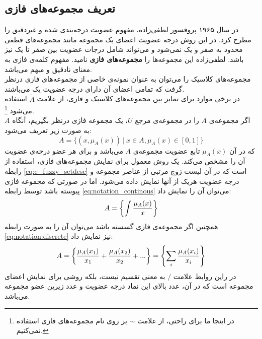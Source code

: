 \documentclass[12pt,a4paper]{article}
\theoremstyle{definition}
\begin{document}
 \subsection{تعریف مجموعه‌های فازی}
در سال ۱۹۶۵ پروفسور لطفی‌زاده، مفهوم عضویت درجه‌بندی شده و غیردقیق را مطرح کرد. در این روش درجه عضویت اعضای یک مجموعه مانند مجموعه‌های قطعی محدود به صفر و یک نمی‌شود و می‌تواند شامل درجات عضویت بین صفر تا یک نیز باشد. لطفی‌زاده این مجموعه‌ها را 
\textbf{مجموعه‌های فازی}
 نامید. مفهوم کلمه‌ی فازی به معنای نادقیق و مبهم می‌باشد. \\
 مجموعه‌های کلاسیک را می‌توان به عنوان نمونه‌ی خاصی از مجموعه‌های فازی درنظر گرفت که تمامی اعضای آن دارای درجه عضویت یک می‌باشند.
 \cite{Bojadziev2007}
 \\
 در برخی موارد برای تمایز بین مجموعه‌های کلاسیک و فازی، از علامت $\widetilde{A}$ استفاده می‌شود
 \footnote{ در اینجا ما برای راحتی، از علامت $ \sim $ بر روی نام مجموعه‌های فازی استفاده نمی‌کنیم.}.
 \cite{Lee2005}
 \\
 اگر مجموعه‌ی $A$ را در مجموعه‌ی مرجع $U$، یک مجموعه فازی درنظر بگیریم، آنگاه $A$ به صورت زیر تعریف می‌شود:
\begin{equation}\label{eq:e_fuzzy_setdesc}
A= \{  (x, \mu_{A}(x))\ |\ x \in A, \mu_{A}(x) \in [0,1]  \}
\end{equation} 
که در آن $\mu_{A}(x)$ تابع عضویت مجموعه‌ی $A$ می‌باشد و برای هر عضو درجه‌ی عضویت آن را مشخص می‌کند. 
 یک روش معمول برای نمایش مجموعه‌های فازی، استفاده از رابطه 
\ref{eq:e_fuzzy_setdesc}
است که در آن لیست زوج مرتبی از عناصر مجموعه و درجه عضویت هریک از آنها نمایش داده می‌شود.
اما در صورتی که مجموعه فازی پیوسته باشد توسط رابطه 
\ref{eq:notation_continous}
می‌توان آن را نمایش داد:
\begin{equation}\label{eq:notation_continous}
A=\left\lbrace  \int {\mu_{A}(x) \over x} \right\rbrace
\end{equation}
همچنین اگر مجموعه‌ی فازی گسسته باشد می‌توان آن را به صورت رابطه 
\ref{eq:notation:discrete}
نیز نمایش داد:
\cite{Ross2004}
\begin{equation}\label{eq:notation:discrete}
	A=\left\lbrace {\mu_{A}(x_1) \over x_1}+{\mu_{A}(x_2) \over x_2}+... \right\rbrace = \left\lbrace \sum_{i} {\mu_{A}(x_i) \over x_i}\right\rbrace 
\end{equation}
در راین روابط علامت $/$ به معنی تقسیم نیست، بلکه روشی برای نمایش اعضای مجموعه است که در آن، عدد بالای این نماد درجه عضویت و عدد زیرین عضو مجموعه می‌باشد.
 \cite{Bojadziev2007}
 \\
\end{document}
